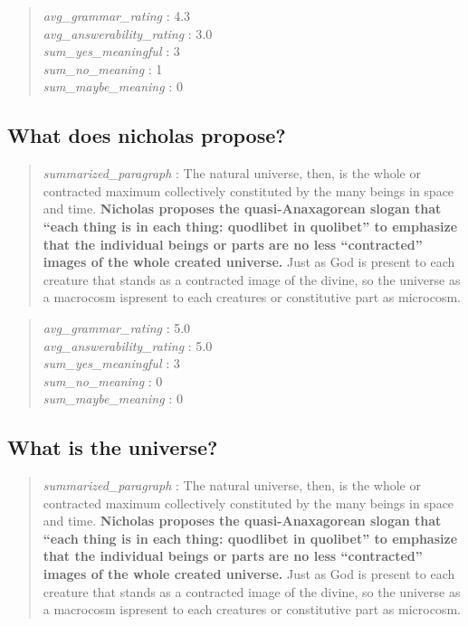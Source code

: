 \begin{quote}
\emph{avg\_grammar\_rating} : 4.3\\
\emph{avg\_answerability\_rating} : 3.0\\
\emph{sum\_yes\_meaningful} : 3\\
\emph{sum\_no\_meaning} : 1\\
\emph{sum\_maybe\_meaning} : 0
\end{quote}

\hypertarget{what-does-nicholas-propose}{%
\subsection{What does nicholas
propose?}\label{what-does-nicholas-propose}}

\begin{quote}
\emph{summarized\_paragraph} : The natural universe, then, is the whole
or contracted maximum collectively constituted by the many beings in
space and time. \textbf{Nicholas proposes the quasi-Anaxagorean slogan
that ``each thing is in each thing: quodlibet in quolibet'' to emphasize
that the individual beings or parts are no less ``contracted'' images of
the whole created universe.} Just as God is present to each creature
that stands as a contracted image of the divine, so the universe as a
macrocosm ispresent to each creatures or constitutive part as microcosm.
\end{quote}

\begin{quote}
\emph{avg\_grammar\_rating} : 5.0\\
\emph{avg\_answerability\_rating} : 5.0\\
\emph{sum\_yes\_meaningful} : 3\\
\emph{sum\_no\_meaning} : 0\\
\emph{sum\_maybe\_meaning} : 0
\end{quote}

\hypertarget{what-is-the-universe}{%
\subsection{What is the universe?}\label{what-is-the-universe}}

\begin{quote}
\emph{summarized\_paragraph} : The natural universe, then, is the whole
or contracted maximum collectively constituted by the many beings in
space and time. \textbf{Nicholas proposes the quasi-Anaxagorean slogan
that ``each thing is in each thing: quodlibet in quolibet'' to emphasize
that the individual beings or parts are no less ``contracted'' images of
the whole created universe.} Just as God is present to each creature
that stands as a contracted image of the divine, so the universe as a
macrocosm ispresent to each creatures or constitutive part as microcosm.
\end{quote}

